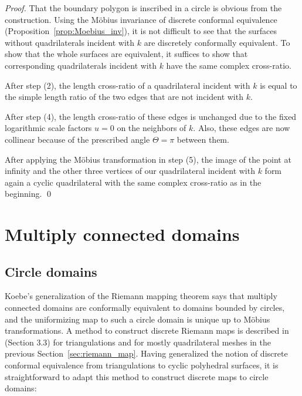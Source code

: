 \documentclass[Thesis]{subfiles}
\begin{document}
\begin{proof}
  That the boundary polygon is inscribed in a circle is obvious from
  the construction.  Using the M{\"o}bius invariance of discrete
  conformal equivalence (Proposition~\ref{prop:Moebius_inv}), it is
  not difficult to see that the surfaces without quadrilaterals
  incident with $k$ are discretely conformally equivalent. To show
  that the whole surfaces are equivalent, it suffices to show that
  corresponding quadrilaterals incident with $k$ have the same complex
  cross-ratio.

  After step (2), the length cross-ratio of a quadrilateral incident with
  $k$ is equal to the simple length ratio of the two edges that are
  not incident with $k$. 

  After step (4), the length cross-ratio of these edges is unchanged due
  to the fixed logarithmic scale factors $u=0$ on the neighbors of
  $k$. Also, these edges are now collinear because of the prescribed
  angle $\Theta=\pi$ between them.

  After applying the M{\"o}bius transformation in step (5), the image of
  the point at infinity and the other three vertices of our
  quadrilateral incident with $k$ form again a cyclic quadrilateral
  with the same complex cross-ratio as in the beginning.
  \qed
\end{proof}

\section{Multiply connected domains}
\label{sec:multiply_connected}

\subsection{Circle domains}
\label{sec:circle_domains}

Koebe's generalization of the Riemann mapping theorem says that
multiply connected domains are conformally equivalent to domains
bounded by circles, and the uniformizing map to such a circle domain
is unique up to M{\"o}bius transformations. A method to construct
discrete Riemann maps is described in~\cite{BPS2015:dconf} (Section
3.3) for triangulations and for mostly quadrilateral meshes in
the previous Section~\ref{sec:riemann_map}. Having generalized the
notion of discrete conformal equivalence from triangulations to cyclic
polyhedral surfaces, it is straightforward to adapt this method to
construct discrete maps to circle domains: 
\end{document}
